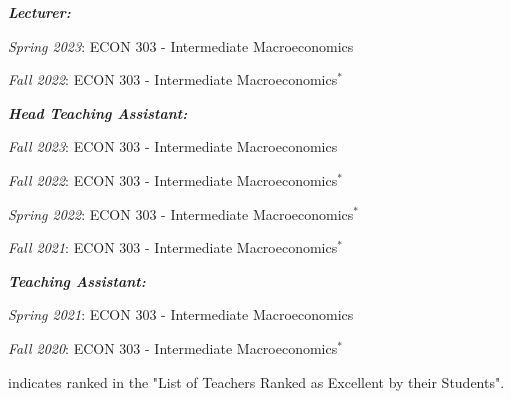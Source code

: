 \documentclass[letterpaper,11pt]{article}
\begin{document}
\begin{adjustwidth}{6mm}{0mm}
  \textbf{\textit{Lecturer:}}
\end{adjustwidth}

\begin{adjustwidth}{9mm}{0mm}
  \textit{Spring 2023}: ECON 303 - Intermediate Macroeconomics
\end{adjustwidth}

\begin{adjustwidth}{9mm}{0mm}
  \textit{Fall 2022}: ECON 303 - Intermediate Macroeconomics$^*$
\end{adjustwidth}

\begin{adjustwidth}{6mm}{0mm}
  \textbf{\textit{Head Teaching Assistant:}}
\end{adjustwidth}

\begin{adjustwidth}{9mm}{0mm}
  \textit{Fall 2023}: ECON 303 - Intermediate Macroeconomics
\end{adjustwidth}

\begin{adjustwidth}{9mm}{0mm}
  \textit{Fall 2022}: ECON 303 - Intermediate Macroeconomics$^*$
\end{adjustwidth}

\begin{adjustwidth}{9mm}{0mm}
  \textit{Spring 2022}: ECON 303 - Intermediate Macroeconomics$^*$
\end{adjustwidth}

\begin{adjustwidth}{9mm}{0mm}
  \textit{Fall 2021}: ECON 303 - Intermediate Macroeconomics$^*$
\end{adjustwidth}

\begin{adjustwidth}{6mm}{0mm}
  \textbf{\textit{Teaching Assistant:}}
\end{adjustwidth}

\begin{adjustwidth}{9mm}{0mm}
  \textit{Spring 2021}: ECON 303 - Intermediate Macroeconomics
\end{adjustwidth}

\begin{adjustwidth}{9mm}{0mm}
  \textit{Fall 2020}: ECON 303 - Intermediate Macroeconomics$^*$
\end{adjustwidth}

\begin{adjustwidth}{3mm}{0mm}
  \scriptsize * indicates ranked in the "List of Teachers Ranked as Excellent by their Students".
\end{adjustwidth}
\end{document}
